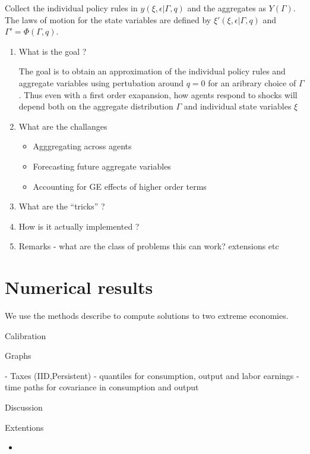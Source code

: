 \documentclass[thmsb,11pt]{article}
\begin{document}
  Collect the individual policy rules in $y(\xi,\epsilon|\Gamma,q)$ and the aggregates as $Y(\Gamma)$. The laws of motion for the state variables are defined by $\xi'(\xi,\epsilon|\Gamma,q)$ and $\Gamma'=\Phi(\Gamma,q)$.
\begin{enumerate}


\item What is the goal ?

  The goal is to obtain an approximation of the individual policy rules and aggregate variables using pertubation around $q=0$ for an aribrary choice of $\Gamma$. Thus even with a first order exapansion, how agents respond to shocks will depend both on the aggregate distribution  $\Gamma$ and individual state variables $\xi$

\item What are the challanges

  \begin{itemize}
  \item Agggregating across agents 
  \item Forecasting future aggregate variables
  \item Accounting for GE effects of higher order terms
  \end{itemize}

\item What are the ``tricks'' ?

\item How is it actually implemented ?
\item Remarks - what are the class of problems this can work? extensions etc
\end{enumerate}


  \section{Numerical results}
We use the methods describe to compute solutions to two extreme economies. 

Calibration  

Graphs

- Taxes (IID,Persistent)
- quantiles for consumption, output and labor earnings
- time paths for covariance in consumption and output




Discussion



Extentions









  \begin{itemize}
  \item 
  \end{itemize}
\end{document}
